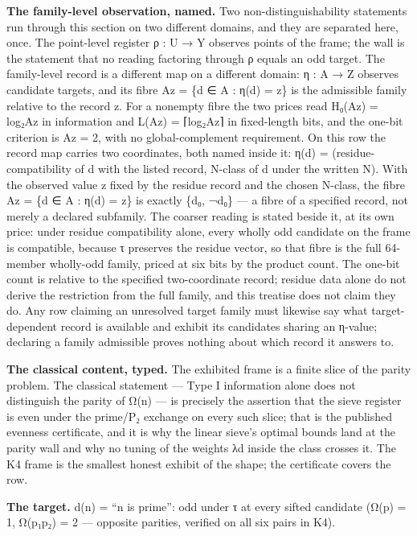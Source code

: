 \documentclass[10pt]{article}
\renewcommand{\_}{\origunderscore\allowbreak}
\begin{document}
\textbf{The family-level observation, named.} Two non-distinguishability
statements run through this section on two different domains, and they
are separated here, once. The point-level register ρ : U → Y observes
points of the frame; the wall is the statement that no reading factoring
through ρ equals an odd target. The family-level record is a different
map on a different domain: η : A → Z observes candidate targets, and its
fibre A\_z = \{d ∈ A : η(d) = z\} is the admissible family relative to
the record z. For a nonempty fibre the two prices read H₀(A\_z) =
log₂\textbar A\_z\textbar{} in information and L(A\_z) =
⌈log₂\textbar A\_z\textbar⌉ in fixed-length bits, and the one-bit
criterion is \textbar A\_z\textbar{} = 2, with no global-complement
requirement. On this row the record map carries two coordinates, both
named inside it: η(d) = (residue-compatibility of d with the listed
record, N-class of d under the written N). With the observed value z
fixed by the residue record and the chosen N-class, the fibre A\_z = \{d
∈ A : η(d) = z\} is exactly \{d₀, ¬d₀\} --- a fibre of a specified
record, not merely a declared subfamily. The coarser reading is stated
beside it, at its own price: under residue compatibility alone, every
wholly odd candidate on the frame is compatible, because τ preserves the
residue vector, so that fibre is the full 64-member wholly-odd family,
priced at six bits by the product count. The one-bit count is relative
to the specified two-coordinate record; residue data alone do not derive
the restriction from the full family, and this treatise does not claim
they do. Any row claiming an unresolved target family must likewise say
what target-dependent record is available and exhibit its candidates
sharing an η-value; declaring a family admissible proves nothing about
which record it answers to.

\textbf{The classical content, typed.} The exhibited frame is a finite
slice of the parity problem. The classical statement --- Type I
information alone does not distinguish the parity of Ω(n) --- is
precisely the assertion that the sieve register is even under the
prime/P₂ exchange on every such slice; that is the published evenness
certificate, and it is why the linear sieve's optimal bounds land at the
parity wall and why no tuning of the weights λ\_d inside the class
crosses it. The K4 frame is the smallest honest exhibit of the shape;
the certificate covers the row.

\textbf{The target.} d(n) = ``n is prime'': odd under τ at every sifted
candidate (Ω(p) = 1, Ω(p₁p₂) = 2 --- opposite parities, verified on all
six pairs in K4).
\end{document}
